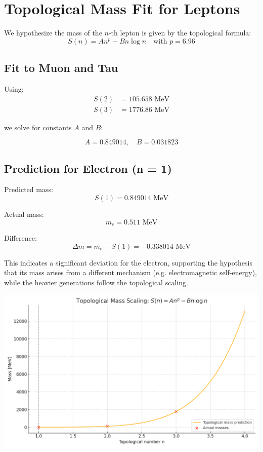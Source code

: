 \documentclass{article}
\begin{document}
\section*{Topological Mass Fit for Leptons}

We hypothesize the mass of the $n$-th lepton is given by the topological formula:
\[
S(n) = A n^p - B n \log n \quad \text{with } p = 6.96
\]

\subsection*{Fit to Muon and Tau}

Using:
\begin{align*}
S(2) &= 105.658 \text{ MeV} \\
S(3) &= 1776.86 \text{ MeV}
\end{align*}

we solve for constants $A$ and $B$:

\[
A = 0.849014, \quad B = 0.031823
\]

\subsection*{Prediction for Electron (n = 1)}

Predicted mass:
\[
S(1) = 0.849014 \text{ MeV}
\]

Actual mass:
\[
m_e = 0.511 \text{ MeV}
\]

Difference:
\[
\Delta m = m_e - S(1) = -0.338014 \text{ MeV}
\]

This indicates a significant deviation for the electron, supporting the hypothesis that its mass arises from a different mechanism (e.g. electromagnetic self-energy), while the heavier generations follow the topological scaling.

\includegraphics[width=\linewidth]{topological_mass_fit.png}
\end{document}

